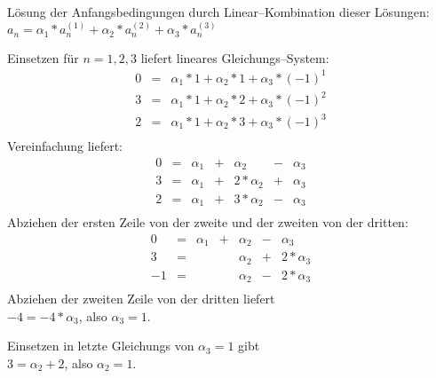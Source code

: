 
\begin{slide}{}
\normalsize

\begin{center}
\end{center}
\vspace*{0.5cm}

\footnotesize
L\"osung der Anfangsbedingungen durch Linear--Kombination dieser L\"osungen: \\[0.3cm]
\hspace*{1.3cm} 
$a_n = \alpha_1 * a^{(1)}_n + \alpha_2 * a^{(2)}_n + \alpha_3 * a^{(3)}_n$

Einsetzen f\"ur $n=1,2,3$ liefert lineares Gleichungs--System: 
$$
\begin{array}{lcl}
  0 & = & \alpha_1 * 1 + \alpha_2 * 1 + \alpha_3 * (-1)^1  \\
  3 & = & \alpha_1 * 1 + \alpha_2 * 2 + \alpha_3 * (-1)^2  \\
  2 & = & \alpha_1 * 1 + \alpha_2 * 3 + \alpha_3 * (-1)^3  \\
\end{array}
$$
Vereinfachung liefert:
$$
\begin{array}{lcrcrcr}
  0 & = & \alpha_1 & + &     \alpha_2 & - & \alpha_3   \\
  3 & = & \alpha_1 & + & 2 * \alpha_2 & + &\alpha_3  \\
  2 & = & \alpha_1 & + & 3 * \alpha_2 & -& \alpha_3  \\
\end{array}
$$
Abziehen der ersten Zeile von der zweite und der zweiten von der dritten:
$$
\begin{array}{rcrcrcr}
  0 & = & \alpha_1 & + & \alpha_2 & - &     \alpha_3   \\
  3 & = &          &   & \alpha_2 & + & 2 * \alpha_3  \\
 -1 & = &          &   & \alpha_2 & - & 2 * \alpha_3  \\
\end{array}
$$
Abziehen der zweiten Zeile von der dritten liefert \\[0.3cm]
\hspace*{1.3cm} $- 4 = - 4 * \alpha_3$, \quad also $\alpha_3 = 1$.

Einsetzen in letzte Gleichungs von $\alpha_3 = 1$ gibt \\[0.3cm]
\hspace*{1.3cm} $3 = \alpha_2 + 2$, \quad also $\alpha_2 = 1$.


\end{slide}
